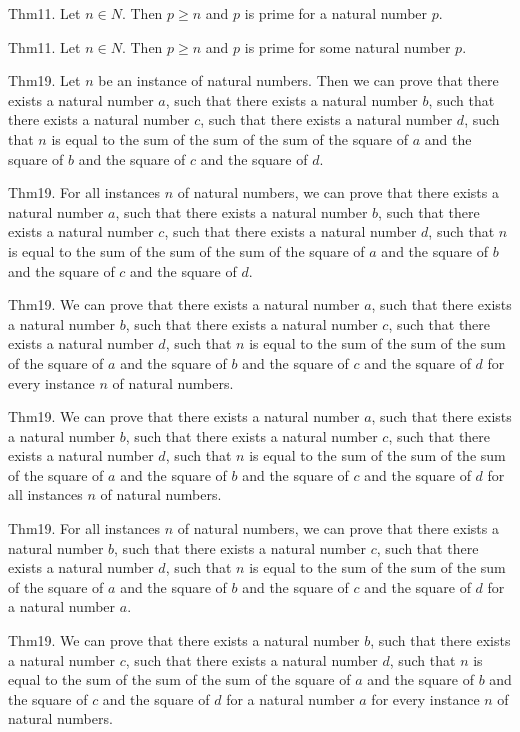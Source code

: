 \documentclass{article}
\begin{document}
Thm11. Let $n \in N$. Then $p \geq n$ and $p$ is prime for a natural number $p$.

Thm11. Let $n \in N$. Then $p \geq n$ and $p$ is prime for some natural number $p$.

Thm19. Let $n$ be an instance of natural numbers. Then we can prove that there exists a natural number $a$, such that there exists a natural number $b$, such that there exists a natural number $c$, such that there exists a natural number $d$, such that $n$ is equal to the sum of the sum of the sum of the square of $a$ and the square of $b$ and the square of $c$ and the square of $d$.

Thm19. For all instances $n$ of natural numbers, we can prove that there exists a natural number $a$, such that there exists a natural number $b$, such that there exists a natural number $c$, such that there exists a natural number $d$, such that $n$ is equal to the sum of the sum of the sum of the square of $a$ and the square of $b$ and the square of $c$ and the square of $d$.

Thm19. We can prove that there exists a natural number $a$, such that there exists a natural number $b$, such that there exists a natural number $c$, such that there exists a natural number $d$, such that $n$ is equal to the sum of the sum of the sum of the square of $a$ and the square of $b$ and the square of $c$ and the square of $d$ for every instance $n$ of natural numbers.

Thm19. We can prove that there exists a natural number $a$, such that there exists a natural number $b$, such that there exists a natural number $c$, such that there exists a natural number $d$, such that $n$ is equal to the sum of the sum of the sum of the square of $a$ and the square of $b$ and the square of $c$ and the square of $d$ for all instances $n$ of natural numbers.

Thm19. For all instances $n$ of natural numbers, we can prove that there exists a natural number $b$, such that there exists a natural number $c$, such that there exists a natural number $d$, such that $n$ is equal to the sum of the sum of the sum of the square of $a$ and the square of $b$ and the square of $c$ and the square of $d$ for a natural number $a$.

Thm19. We can prove that there exists a natural number $b$, such that there exists a natural number $c$, such that there exists a natural number $d$, such that $n$ is equal to the sum of the sum of the sum of the square of $a$ and the square of $b$ and the square of $c$ and the square of $d$ for a natural number $a$ for every instance $n$ of natural numbers.
\end{document}

